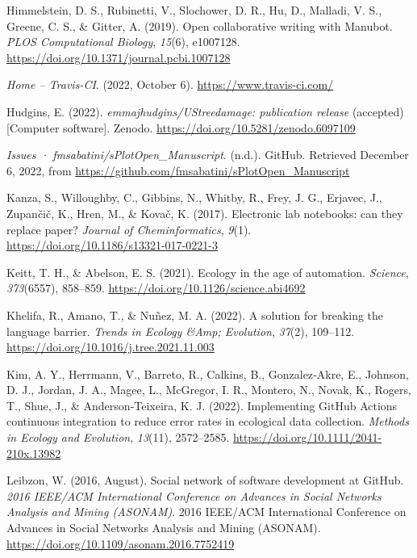 \begin{CSLReferences}{1}{0}
\leavevmode{}%
Himmelstein, D. S., Rubinetti, V., Slochower, D. R., Hu, D., Malladi, V. S., Greene, C. S., \& Gitter, A. (2019). Open collaborative writing with Manubot. \emph{PLOS Computational Biology}, \emph{15}(6), e1007128. \url{https://doi.org/10.1371/journal.pcbi.1007128}

\leavevmode{}%
\emph{Home -- Travis-CI}. (2022, October 6). \url{https://www.travis-ci.com/}

\leavevmode{}%
Hudgins, E. (2022). \emph{emmajhudgins/UStreedamage: publication release} (accepted) {[}Computer software{]}. Zenodo. \url{https://doi.org/10.5281/zenodo.6097109}

\leavevmode{}%
\emph{Issues · fmsabatini/sPlotOpen\_Manuscript}. (n.d.). GitHub. Retrieved December 6, 2022, from \url{https://github.com/fmsabatini/sPlotOpen_Manuscript}

\leavevmode{}%
Kanza, S., Willoughby, C., Gibbins, N., Whitby, R., Frey, J. G., Erjavec, J., Zupančič, K., Hren, M., \& Kovač, K. (2017). Electronic lab notebooks: can they replace paper? \emph{Journal of Cheminformatics}, \emph{9}(1). \url{https://doi.org/10.1186/s13321-017-0221-3}

\leavevmode{}%
Keitt, T. H., \& Abelson, E. S. (2021). Ecology in the age of automation. \emph{Science}, \emph{373}(6557), 858--859. \url{https://doi.org/10.1126/science.abi4692}

\leavevmode{}%
Khelifa, R., Amano, T., \& Nuñez, M. A. (2022). A solution for breaking the language barrier. \emph{Trends in Ecology \&Amp; Evolution}, \emph{37}(2), 109--112. \url{https://doi.org/10.1016/j.tree.2021.11.003}

\leavevmode{}%
Kim, A. Y., Herrmann, V., Barreto, R., Calkins, B., Gonzalez‐Akre, E., Johnson, D. J., Jordan, J. A., Magee, L., McGregor, I. R., Montero, N., Novak, K., Rogers, T., Shue, J., \& Anderson‐Teixeira, K. J. (2022). Implementing GitHub Actions continuous integration to reduce error rates in ecological data collection. \emph{Methods in Ecology and Evolution}, \emph{13}(11), 2572--2585. \url{https://doi.org/10.1111/2041-210x.13982}

\leavevmode{}%
Leibzon, W. (2016, August). Social network of software development at GitHub. \emph{2016 IEEE/ACM International Conference on Advances in Social Networks Analysis and Mining (ASONAM)}. 2016 IEEE/ACM International Conference on Advances in Social Networks Analysis and Mining (ASONAM). \url{https://doi.org/10.1109/asonam.2016.7752419}


\end{CSLReferences}

